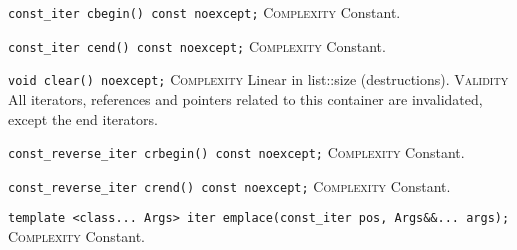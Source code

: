 \noindent{}\hspace*{0.25em}\lstinline[basicstyle=\ttfamily\color{cgreen}]{const_iter cbegin() const noexcept;} \textsc{Complexity} Constant.\\\vspace{-0.6em}

\noindent{}\hspace*{0.25em}\lstinline[basicstyle=\ttfamily\color{cgreen}]{const_iter cend() const noexcept;} \textsc{Complexity} Constant.\\\vspace{-0.6em}

\noindent{}\hspace*{0.25em}\lstinline[basicstyle=\ttfamily\color{corange}]{void clear() noexcept;} \textsc{Complexity} Linear in list::size (destructions). \textsc{Validity} All iterators, references and pointers related to this container are invalidated, except the end iterators.\\\vspace{-0.6em}

\noindent{}\hspace*{0.25em}\lstinline[basicstyle=\ttfamily\color{cgreen}]{const_reverse_iter crbegin() const noexcept;} \textsc{Complexity} Constant.\\\vspace{-0.6em}

\noindent{}\hspace*{0.25em}\lstinline[basicstyle=\ttfamily\color{cgreen}]{const_reverse_iter crend() const noexcept;} \textsc{Complexity} Constant.\\\vspace{-0.6em}

\noindent{}\hspace*{0.25em}\lstinline[basicstyle=\ttfamily\color{cgreen}]{template <class... Args> iter emplace(const_iter pos, Args&&... args);} \textsc{Complexity} Constant.\\\vspace{-0.6em}


